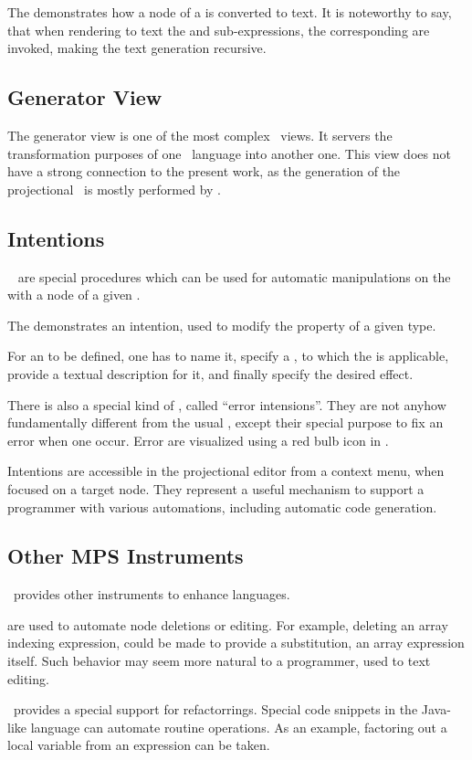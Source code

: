 
The  demonstrates how a node of a   is converted to text. It is noteworthy 
to say, that when rendering to text the  and  sub-expressions, the corresponding  are invoked,
making the text generation recursive.


\subsection{Generator View}
The generator view is one of the most complex \jbmps\ views. It servers the transformation purposes of one \jbmps\ language into another one.
This view does not have a strong connection to the present work, as the generation of the projectional \cpppl\ is mostly performed by .

\subsection{Intentions}
\label{intentions}

\jbmps\  are special procedures which can be used for automatic manipulations on the  with a node of a given .


The  demonstrates an intention, used to modify the  property of a given type. 

For an  to be defined, one has to name it, specify a , to which the  is applicable,
provide a textual description for it, and finally specify the desired effect. 

There is also a special kind of , called ``error intensions''. They are not anyhow fundamentally different 
from the usual , except their special purpose to fix an error when one occur. Error  are
visualized using a red bulb icon in \jbmps.

Intentions are accessible in the projectional editor from a context menu, when focused on a target node. They represent 
a useful mechanism to support a programmer with various automations, including automatic code generation.

\subsection{Other MPS Instruments}

\jbmps\ provides other instruments to enhance languages. 

 are used to automate node deletions or editing. For example, deleting an array indexing expression, could be made
to provide a substitution, an array expression itself. Such behavior may seem more natural to a programmer, used to text editing.

\jbmps\ provides a special support for refactorrings. Special code snippets in the Java-like language can automate routine operations.
As an example, factoring out a local variable from an expression can be taken.